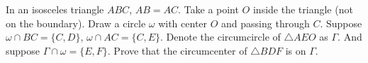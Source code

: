 In an isosceles triangle $ABC$, $AB=AC$. Take a point $O$ inside the triangle (not on the boundary). Draw a circle $\omega$ with center $O$ and passing through $C$. Suppose $\omega\cap BC=\{C,D\}$, $\omega\cap AC=\{C,E\}$. Denote the circumcircle of $\triangle AEO$ as $\Gamma$. And suppose $\Gamma\cap\omega=\{E,F\}$. Prove that the circumcenter of $\triangle BDF$ is on $\Gamma$.